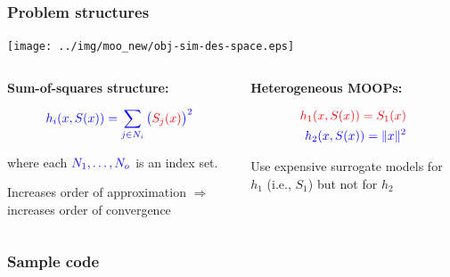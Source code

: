 \documentclass[aspectratio=169]{beamer}
\begin{document}
\begin{frame}\frametitle{Problem structures}
\begin{center}
\texttt{[image: ../img/moo\_new/obj-sim-des-space.eps]}
\end{center}
\begin{columns}
\begin{column}{0.5\textwidth}
\textbf{Sum-of-squares structure:}

\medskip

{\large
$$
{\color{blue} h_i(x, S(x)) = \sum_{j \in N_i} \big({\color{red}S_j(x)}\big)^2}
$$

where each ${\color{blue} N_1, \ldots, N_o}$ is an index set.
}

\bigskip

Increases order of approximation $\Rightarrow$
increases order of convergence

\end{column}
\begin{column}{0.5\textwidth}
\textbf{Heterogeneous MOOPs:}

{\large
\begin{align*}
{\color{red} h_1(x, S(x)) = S_1(x)}\\
{\color{blue} h_2(x, S(x)) = \|x \|^2}
\end{align*}
}

Use expensive surrogate models for {\color{red} $h_1$} (i.e.,
{\color{red} $S_1$}) but not for {\color{blue} $h_2$}

\end{column}
\end{columns}
\end{frame}

\begin{frame}[fragile]\frametitle{Sample code}
  \lstset{style=python}
  
\end{frame}
\end{document}
